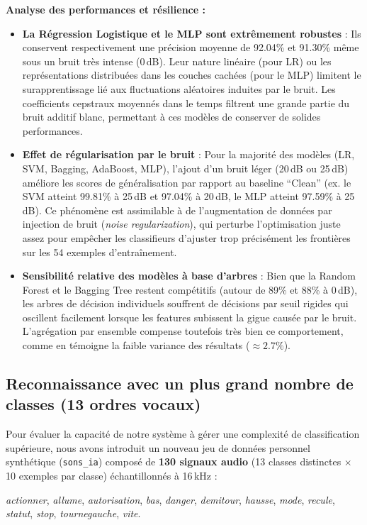 \documentclass{name}
\begin{document}
\textbf{Analyse des performances et résilience :}
\begin{itemize}
    \item \textbf{La Régression Logistique et le MLP sont extrêmement robustes} : Ils conservent respectivement une précision moyenne de 92.04\% et 91.30\% même sous un bruit très intense (0\,dB). Leur nature linéaire (pour LR) ou les représentations distribuées dans les couches cachées (pour le MLP) limitent le surapprentissage lié aux fluctuations aléatoires induites par le bruit. Les coefficients cepstraux moyennés dans le temps filtrent une grande partie du bruit additif blanc, permettant à ces modèles de conserver de solides performances.
    \item \textbf{Effet de régularisation par le bruit} : Pour la majorité des modèles (LR, SVM, Bagging, AdaBoost, MLP), l'ajout d'un bruit léger (20\,dB ou 25\,dB) améliore les scores de généralisation par rapport au baseline ``Clean'' (ex. le SVM atteint 99.81\% à 25\,dB et 97.04\% à 20\,dB, le MLP atteint 97.59\% à 25\,dB). Ce phénomène est assimilable à de l'augmentation de données par injection de bruit (\textit{noise regularization}), qui perturbe l'optimisation juste assez pour empêcher les classifieurs d'ajuster trop précisément les frontières sur les 54 exemples d'entraînement.
    \item \textbf{Sensibilité relative des modèles à base d'arbres} : Bien que la Random Forest et le Bagging Tree restent compétitifs (autour de 89\% et 88\% à 0\,dB), les arbres de décision individuels souffrent de décisions par seuil rigides qui oscillent facilement lorsque les features subissent la gigue causée par le bruit. L'agrégation par ensemble compense toutefois très bien ce comportement, comme en témoigne la faible variance des résultats ($\approx 2.7\%$).
\end{itemize}
\subsection{Reconnaissance avec un plus grand nombre de classes (13 ordres vocaux)}

Pour évaluer la capacité de notre système à gérer une complexité de classification supérieure, nous avons introduit un nouveau jeu de données personnel synthétique (\texttt{sons\_ia}) composé de \textbf{130 signaux audio} (13 classes distinctes $\times$ 10 exemples par classe) échantillonnés à 16\,kHz :
\begin{center}
\textit{actionner}, \textit{allume}, \textit{autorisation}, \textit{bas}, \textit{danger}, \textit{demitour}, \textit{hausse}, \textit{mode}, \textit{recule}, \textit{statut}, \textit{stop}, \textit{tournegauche}, \textit{vite}.
\end{center}
\end{document}
